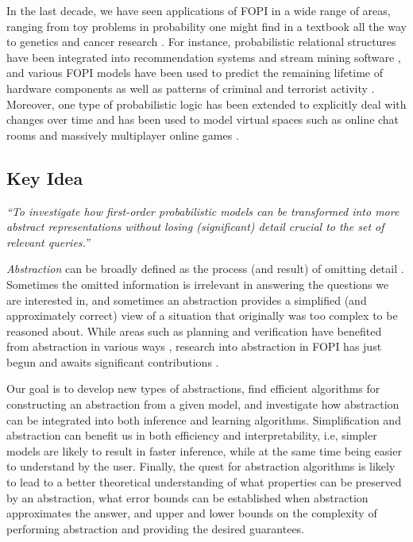\documentclass[11pt,english,twocolumn]{article}
\begin{document}
In the last decade, we have seen applications of FOPI in a wide range of areas,
ranging from toy problems in probability one might find in a textbook
\cite{DBLP:conf/ijcai/DriesKDBR17} all the way to genetics
\cite{DBLP:journals/jcb/SakhanenkoG12} and cancer research
\cite{DBLP:conf/ilp/Corte-RealD017}. For instance, probabilistic relational
structures have been integrated into recommendation systems
\cite{DBLP:journals/corr/YangKAGN16} and stream mining software
\cite{DBLP:conf/icdm/ChandraSKTA14}, and various FOPI models have been used to
predict the remaining lifetime of hardware components
\cite{vlasselaer2012statistical} as well as patterns of criminal and terrorist
activity \cite{DBLP:conf/sdm/DelaneyFCWJ10}. Moreover, one type of probabilistic
logic has been extended to explicitly deal with changes over time and has been
used to model virtual spaces such as online chat rooms and massively multiplayer
online games \cite{DBLP:conf/pkdd/ThonLR08,DBLP:journals/ml/ThonLR11}.

\subsection*{Key Idea} %

\emph{``To investigate how first-order probabilistic models can be transformed
  into more abstract representations without losing (significant) detail
  crucial to the set of relevant queries.''}

\emph{Abstraction} can be broadly defined as the process (and result) of
omitting detail \cite{doi:10.1086/670300}. Sometimes the omitted information is
irrelevant in answering the questions we are interested in, and sometimes an
abstraction provides a simplified (and approximately correct) view of a
situation that originally was too complex to be reasoned about. While areas such
as planning and verification have benefited from abstraction in various ways
\cite{saitta2013abstraction}, research into abstraction in FOPI has just begun
and awaits significant contributions
\cite{DBLP:journals/corr/abs-1810-02434,DBLP:conf/icml/HoltzenBM18,DBLP:conf/uai/HoltzenMB17}.

Our goal is to develop new types of abstractions, find efficient
algorithms for constructing an abstraction from a given model, and investigate
how abstraction can be integrated into both inference and learning algorithms.
Simplification and abstraction can benefit us in both efficiency and
interpretability, i.e, simpler models are likely to result in faster inference,
while at the same time being easier to understand by the user. Finally, the
quest for abstraction algorithms is likely to lead to a better theoretical
understanding of what properties can be preserved by an abstraction, what error
bounds can be established when abstraction approximates the answer, and upper
and lower bounds on the complexity of performing abstraction and providing the
desired guarantees.
\end{document}
